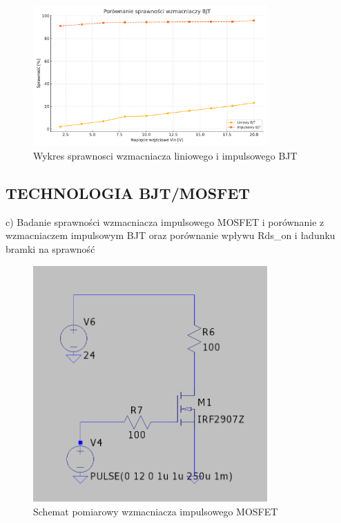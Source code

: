 \documentclass[11pt]{article}
\begin{document}
\begin{figure}[H]
\centering
\includegraphics[width=0.8\textwidth]{aun1_liniowy_impulsowy_bjt.pdf}
\caption{Wykres sprawnosci wzmacniacza liniowego i impulsowego BJT}
\end{figure}

\subsection{TECHNOLOGIA BJT/MOSFET}

c) Badanie sprawności wzmacniacza impulsowego MOSFET i porównanie z wzmacniaczem impulsowym BJT oraz porównanie wpływu Rds_on i ładunku bramki na sprawność

\begin{figure}[H]
\centering
\includegraphics[width=0.8\textwidth]{aun1_impulsowy_mosfet.png}
\caption{Schemat pomiarowy wzmacniacza impulsowego MOSFET}
\end{figure}
\end{document}
